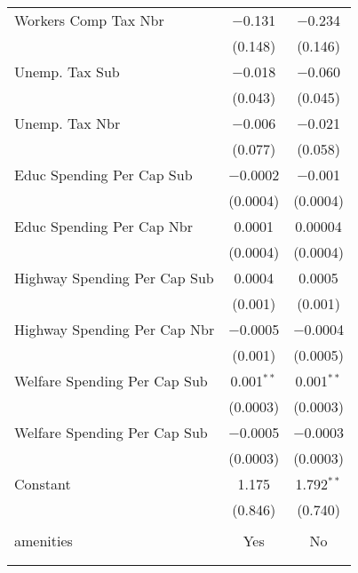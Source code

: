 \begin{table}[!htbp]
\begin{tabular}{@{\extracolsep{5pt}}lcc}
  Workers Comp Tax Nbr & $-$0.131 & $-$0.234 \\ 
  & (0.148) & (0.146) \\ 
  Unemp. Tax Sub & $-$0.018 & $-$0.060 \\ 
  & (0.043) & (0.045) \\ 
  Unemp. Tax Nbr & $-$0.006 & $-$0.021 \\ 
  & (0.077) & (0.058) \\ 
  Educ Spending Per Cap Sub & $-$0.0002 & $-$0.001 \\ 
  & (0.0004) & (0.0004) \\ 
  Educ Spending Per Cap Nbr & 0.0001 & 0.00004 \\ 
  & (0.0004) & (0.0004) \\ 
  Highway Spending Per Cap Sub & 0.0004 & 0.0005 \\ 
  & (0.001) & (0.001) \\ 
  Highway Spending Per Cap Nbr & $-$0.0005 & $-$0.0004 \\ 
  & (0.001) & (0.0005) \\ 
  Welfare Spending Per Cap Sub & 0.001$^{**}$ & 0.001$^{**}$ \\ 
  & (0.0003) & (0.0003) \\ 
  Welfare Spending Per Cap Sub & $-$0.0005 & $-$0.0003 \\ 
  & (0.0003) & (0.0003) \\ 
  Constant & 1.175 & 1.792$^{**}$ \\ 
  & (0.846) & (0.740) \\ 
 \hline \\[-1.8ex] 
amenities & Yes & No \\ 
\hline \\[-1.8ex] 
\hline 
\hline \\[-1.8ex] 
\end{tabular} 
\end{table} 
